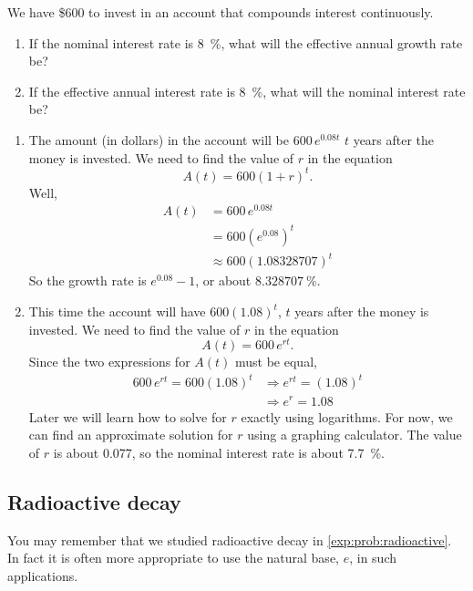 			
\begin{pccexample}
	We have \$600 to invest in an account that compounds interest continuously.  
	\begin{enumerate}
		\item If the nominal interest rate is \SI{8}{\percent}, what will the effective annual growth rate be?
		\item If the effective annual interest rate is \SI{8}{\percent}, what will the nominal interest rate be?
	\end{enumerate}
	\begin{pccsolution}
		\begin{enumerate}
			\item The amount (in dollars) in the account will be $600\,e^{0.08t}$ $t$ years after the money is invested.  We need to find the value of $r$ in the equation $$A(t)=600(1+r)^t.$$  Well, 
			\begin{align*}
				A(t) & = 600\,e^{0.08t}                     \\
				     & = 600\left(e^{0.08}\right)^t         \\
				     & \approx 600\left(1.08328707\right)^t 
			\end{align*}
			So the growth rate is $e^{0.08}-1$, or about $\SI{8.328707}{\percent}$.
			\item This time the account will have $600(1.08)^t$, $t$ years after the money  is invested.  We need to find the value of $r$ in the equation $$A(t)=600\,e^{rt}.$$  
			Since the two expressions for $A(t)$ must be equal,
			\begin{align*}
				600\,e^{rt}  = 600(1.08)^t & \Longrightarrow e^{rt}  = (1.08)^t \\
				                           & \Longrightarrow e^r  = 1.08        
			\end{align*}
			Later we will learn how to solve for $r$ exactly using logarithms.  For now, we can find an approximate solution for $r$ using a graphing calculator.  The value of $r$ is about 0.077, so the nominal interest rate is about \SI{7.7}{\percent}.
		\end{enumerate} 
	\end{pccsolution}
\end{pccexample}
			
\subsection*{Radioactive decay}
You may remember that we studied radioactive decay in \vref{exp:prob:radioactive}. In 
fact it is often more appropriate to use the natural base, $e$, in such applications.
			
